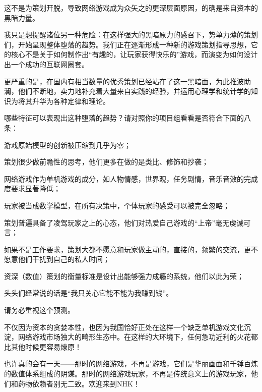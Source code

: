 \documentclass{article}
\begin{document}
这不是为策划开脱，导致网络游戏成为众矢之的更深层面原因，的确是来自资本的黑暗力量。



我只是想提醒诸位另一种危险：在这样强大的黑暗原力的感召下，势单力薄的策划们，开始呈现整体堕落的趋势。我们正在逐渐形成一种新的游戏策划指导思想，它的核心不是关于如何制作出“有趣的，让玩家获得快乐的”游戏，而演变为如何设计出一个成功的互联网圈套。



更严重的是，在国内有相当数量的优秀策划已经站在了这一黑暗面，为此推波助澜，他们不断地，卖力地补充着大量来自实践的经验，并运用心理学和统计学的知识为将其升华为各种定律和理论。



哪些特征可以表现出这种堕落的趋势？请对照你的项目组看看是否符合下面的八条：



游戏原始模型的创新被压缩到几乎为零；



策划很少做前瞻性的思考，他们更多在做的是类比、修饰和抄袭；



网络游戏作为单机游戏的成分，如人物情感，世界观，任务剧情，音乐音效的完成度要求显著降低；



玩家被当成数学模型，在所有决策中，个体玩家的感受可以被完全忽略；



策划普遍具备了凌驾玩家之上的心态，他们对热爱自己游戏的“上帝”毫无虔诚可言；



如果不是工作要求，策划大都不愿意和玩家做主动的，直接的，频繁的交流，更不愿意他们干扰到自己的私人时间；



资深（数值）策划的衡量标准是设计出能够强力成瘾的系统，他们以此为荣；



头头们经常说的话是“我只关心它能不能为我赚到钱”。



请务必重视这个预测。



不仅因为资本的贪婪本性，也因为我国恰好正处在这样一个缺乏单机游戏文化沉淀，网络游戏市场独大的畸形生态中。在这样的大环境下，任何急功近利的火花都比其他时候更容易燎原！



也许真的会有一天——那时的网络游戏，不再是游戏，它们是华丽画面和千锤百炼的数值体系组成的阴谋。那时的网络游戏玩家，不再是传统意义上的游戏玩家，他们和药物依赖者别无二致。欢迎来到NHK！
\end{document}
